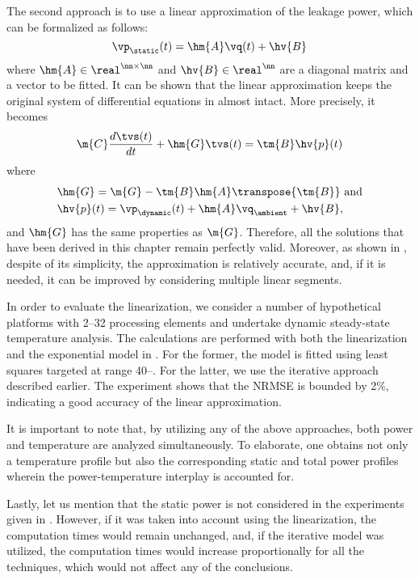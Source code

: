 The second approach is to use a linear approximation of the leakage power, which
can be formalized as follows:
\[
  \vp_\static(t) = \hm{A} \vq(t) + \hv{B}
\]
where $\hm{A} \in \real^{\nn \times \nn}$ and $\hv{B} \in \real^\nn$ are a
diagonal matrix and a vector to be fitted. It can be shown that the linear
approximation keeps the original system of differential equations in
 almost intact. More precisely, it
becomes
\[
  \m{C} \frac{d\tvs(t)}{dt} + \hm{G} \tvs(t) = \tm{B} \hv{p}(t)
\]
where
\begin{align*}
  & \hm{G} = \m{G} - \tm{B} \hm{A} \transpose{\tm{B}} \text{ and} \\
  & \hv{p}(t) = \vp_\dynamic(t) + \hm{A} \vq_\ambient + \hv{B},
\end{align*}
and $\hm{G}$ has the same properties as $\m{G}$. Therefore, all the solutions
that have been derived in this chapter remain perfectly valid. Moreover, as
shown in \cite{liu2007}, despite of its simplicity, the approximation is
relatively accurate, and, if it is needed, it can be improved by considering
multiple linear segments.

In order to evaluate the linearization, we consider a number of hypothetical
platforms with 2--32 processing elements and undertake dynamic steady-state
temperature analysis. The calculations are performed with both the linearization
and the exponential model in . For the former, the model is
fitted using least squares \cite{press2007} targeted at range 40--.
For the latter, we use the iterative approach described earlier. The experiment
shows that the \ac{NRMSE} is bounded by 2\%, indicating a good accuracy of the
linear approximation.

It is important to note that, by utilizing any of the above approaches, both
power and temperature are analyzed simultaneously. To elaborate, one obtains not
only a temperature profile but also the corresponding static and total power
profiles wherein the power-temperature interplay is accounted for.

Lastly, let us mention that the static power is not considered in the
experiments given in . However, if it was
taken into account using the linearization, the computation times would remain
unchanged, and, if the iterative model was utilized, the computation times would
increase proportionally for all the techniques, which would not affect any of
the conclusions.
